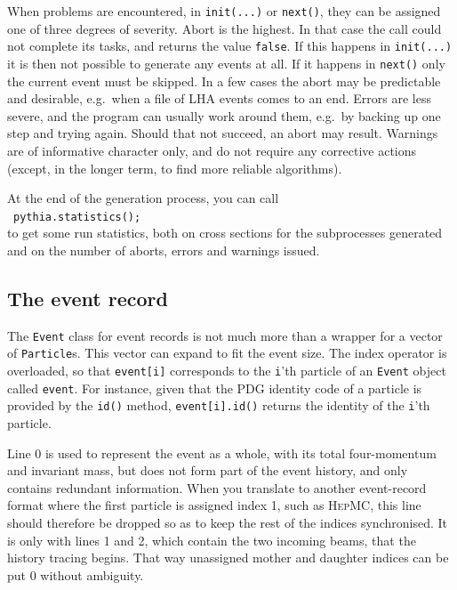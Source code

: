 \documentclass{elsartmod}
\newcommand{\cindent}{\hspace*{10mm}~}
\begin{document}
When problems are encountered, in \texttt{init(...)} or
\texttt{next()}, they can be assigned one of three degrees of
severity. Abort is the highest. In that case the call could not
complete its tasks, and returns the value \texttt{false}. If this
happens in \texttt{init(...)} it is then not possible to generate any
events at all. If it happens in \texttt{next()} only the current event
must be skipped. In a few cases the abort may be predictable and
desirable, e.g.\ when a file of LHA events comes to an end. Errors are
less severe, and the program can usually work around them, e.g.\ by
backing up one step and trying again. Should that not succeed, an
abort may result. Warnings are of informative character only, and do
not require any corrective actions (except, in the longer term, to
find more reliable algorithms).

At the end of the generation process, you can call\\
\cindent \texttt{pythia.statistics();}\\
to get some run statistics, both on cross sections for the 
subprocesses generated and on the number of aborts, errors and 
warnings issued.  

\subsection{The event record}

The \texttt{Event} class for event records is not much more than 
a wrapper for a vector of \texttt{Particle}s. This vector can expand 
to fit the event size. The index operator is overloaded, so that 
\texttt{event[i]} corresponds to the \texttt{i}'th particle of an 
\texttt{Event} object called \texttt{event}. For instance, given 
that the PDG identity code \cite{pdg} of a particle is provided by 
the \texttt{id()} method, \texttt{event[i].id()} returns the identity 
of the \texttt{i}'th particle. 

Line 0 is used to represent the event as a whole, with its total 
four-momentum and invariant mass, but does not form part of the
event history, and only contains redundant information. When you 
translate to another event-record format where the first particle is 
assigned index 1, such as \textsc{HepMC}, this line should therefore
be dropped so as to keep the rest of the indices synchronised. 
It is only with lines 1 and 2, which contain the two incoming beams, 
that the history tracing begins. That way unassigned mother and 
daughter indices can be put 0 without ambiguity.
\end{document}
